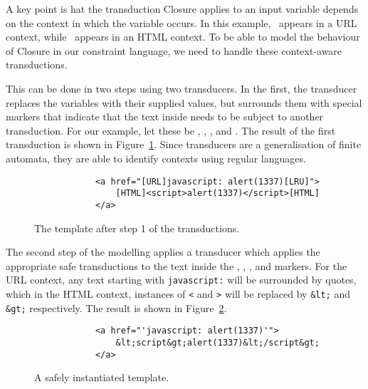 A key point is hat the transduction Closure applies to an input variable depends on the context in which the variable occurs.
In this example, \linkvar\ appears in a URL context, while \linktextvar\ appears in an HTML context.
To be able to model the behaviour of Closure in our constraint language, we need to handle these context-aware transductions.

This can be done in two steps using two transducers.
In the first, the transducer replaces the variables with their supplied values, but surrounds them with special markers that indicate that the text inside needs to be subject to another transduction.
For our example, let these be \urlstarttag, \urlendtag, \htmlstarttag, and \htmlendtag.
The result of the first transduction is shown in Figure~\ref{fig:closure-step-one}.
Since transducers are a generalisation of finite automata, they are able to identify contexts using regular languages.

\begin{figure}
    \begin{verbatim}
            <a href="[URL]javascript: alert(1337)[LRU]">
                [HTML]<script>alert(1337)</script>[HTML]
            </a>
    \end{verbatim}
    \caption{\label{fig:closure-step-one}The template after step 1 of the transductions.}
\end{figure}

The second step of the modelling applies a transducer which applies the appropriate safe transductions to the text inside the \urlstarttag, \urlendtag, \htmlstarttag, and \htmlendtag markers.
For the URL context, any text starting with \texttt{javascript:} will be surrounded by quotes, which in the HTML context, instances of \texttt{<} and \texttt{>} will be replaced by \texttt{\&lt;} and \texttt{\&gt;} respectively.
The result is shown in Figure~\ref{fig:closure-safe}.


\begin{figure}
    \begin{verbatim}
            <a href="'javascript: alert(1337)'">
                &lt;script&gt;alert(1337)&lt;/script&gt;
            </a>
    \end{verbatim}
    \caption{\label{fig:closure-safe}A safely instantiated template.}
\end{figure}



